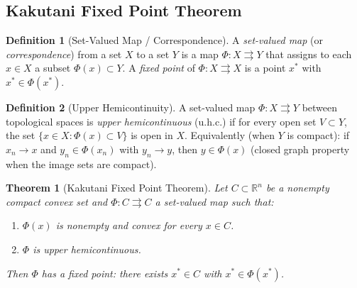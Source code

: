 \documentclass[11pt,a4paper]{article}
\theoremstyle{definition}
\newtheorem{definition}{Definition}[section]
\theoremstyle{plain}
\newtheorem{theorem}{Theorem}[section]
\theoremstyle{remark}
\newcommand{\R}{\mathbb{R}}
\begin{document}
\subsection{Kakutani Fixed Point Theorem}

\begin{definition}[Set-Valued Map / Correspondence]\label{def:set-valued}
A \emph{set-valued map} (or \emph{correspondence}) from a set $X$ to a set $Y$
is a map $\Phi \colon X \rightrightarrows Y$ that assigns to each $x \in X$
a subset $\Phi(x) \subset Y$. A \emph{fixed point} of $\Phi \colon X
\rightrightarrows X$ is a point $x^*$ with $x^* \in \Phi(x^*)$.
\end{definition}

\begin{definition}[Upper Hemicontinuity]\label{def:uhc}
A set-valued map $\Phi \colon X \rightrightarrows Y$ between topological
spaces is \emph{upper hemicontinuous} (u.h.c.) if for every open set
$V \subset Y$, the set $\{x \in X : \Phi(x) \subset V\}$ is open in $X$.
Equivalently (when $Y$ is compact): if $x_n \to x$ and $y_n \in \Phi(x_n)$
with $y_n \to y$, then $y \in \Phi(x)$ (closed graph property when the
image sets are compact).
\end{definition}

\begin{theorem}[Kakutani Fixed Point Theorem]\label{thm:kakutani}
Let $C \subset \R^n$ be a nonempty compact convex set and
$\Phi \colon C \rightrightarrows C$ a set-valued map such that:
\begin{enumerate}[label=(\roman*)]
    \item $\Phi(x)$ is nonempty and convex for every $x \in C$.
    \item $\Phi$ is upper hemicontinuous.
\end{enumerate}
Then $\Phi$ has a fixed point: there exists $x^* \in C$ with
$x^* \in \Phi(x^*)$.
\end{theorem}
\end{document}
